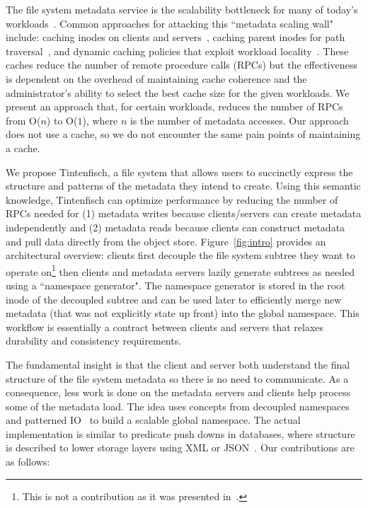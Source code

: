 The file system metadata service is the scalability bottleneck for many of
today's workloads~\cite{roselli:atec2000-FS-workloads,
abad:techreport2012-fstrace, abad:ucc2012-mimesis,
alam:pdsw2011-metadata-scaling, weil:osdi2006-ceph}.  Common approaches for
attacking this ``metadata scaling wall" include: caching inodes on clients and
servers~\cite{depardon:tech13-survey, sinnamohideen:atc2010-ursa,
hildebrand:msst2005-pnfs, devulapalli:ipdps07-pvfs2, welch:fast2008-panasas},
caching parent inodes for path traversal~\cite{patil:fast2011-giga+,
ren:sc2014-indexfs, brandt:msst2003-lh, weil:sc2004-dyn-metadata,
ren:sc2014-indexfs}, and dynamic caching policies that exploit workload
locality~\cite{xing:sc2009-skyfs, zhu:pds2008-hba, li:msst2006-dynamic}.  These
caches reduce the number of remote procedure calls (RPCs) but the effectiveness
is dependent on the overhead of maintaining cache coherence and the
administrator's ability to select the best cache size for the given workloads.
We present an approach that, for certain workloads, reduces the number of RPCs
from O(\(n\)) to O(\(1\)), where \(n\) is the number of metadata accesses. Our
approach does not use a cache, so we do not encounter the same pain points of
maintaining a cache.

We propose Tintenfisch, a file system that allows users to succinctly express
the structure and patterns of the metadata they intend to create.  Using this
semantic knowledge, Tintenfisch can optimize performance by reducing the number
of RPCs needed for (1) metadata writes because clients/servers can create
metadata independently and (2) metadata reads because clients can construct
metadata and pull data directly from the object store. Figure~\ref{fig:intro}
provides an architectural overview: clients first decouple the file system
subtree they want to operate on\footnote{This is not a contribution as it was
presented in~\cite{sevilla:ipdps18-cudele}.} then clients and metadata servers
lazily generate subtrees as needed using a ``namespace generator". The
namespace generator is stored in the root inode of the decoupled subtree and
can be used later to efficiently merge new metadata (that was not explicitly
state up front) into the global namespace. This workflow is essentially a
contract between clients and servers that relaxes durability and consistency
requirements.

The fundamental insight is that the client and server both understand the final
structure of the file system metadata so there is no need to communicate.  As a
consequence, less work is done on the metadata servers and clients help process
some of the metadata load.  The idea uses concepts from decoupled
namespaces~\cite{zheng:pdsw2014-batchfs, zheng:pdsw2015-deltafs} and patterned
IO~\cite{he:hpdc13-plfs-patterns} to build a scalable global namespace. The
actual implementation is similar to predicate push downs in databases, where
structure is described to lower storage layers using XML or
JSON~\cite{shel:pc17-pushdown}. Our contributions are as follows:

